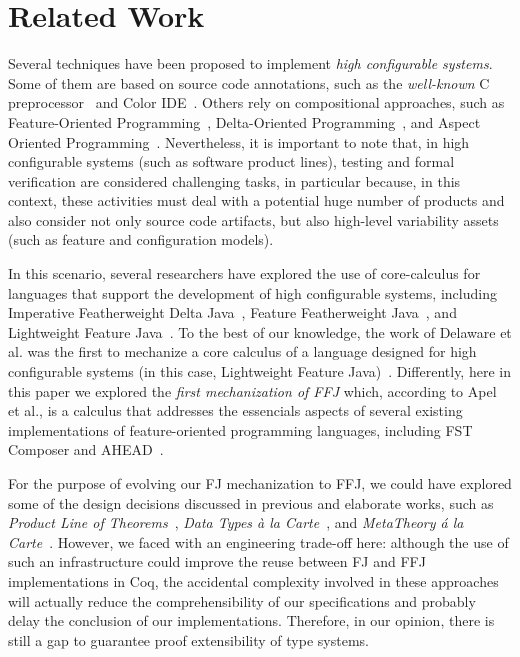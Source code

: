 \section{Related Work}\label{seq:related}

Several techniques have been proposed to implement
\emph{high configurable systems}. Some of
them are based on source code annotations, such as
the \emph{well-known} C preprocessor~\cite{stallman:cpp} and Color IDE~\cite{kastner:icse2008}. Others
rely on compositional approaches, such as
Feature-Oriented Programming~\cite{batory-tse2004,batory_feature-oriented_2004},
Delta-Oriented Programming~\cite{schaefer_delta-oriented_2010}, 
and Aspect Oriented Programming~\cite{kiczales:ecoop2001,alves:splc2005}.
Nevertheless, it is important to
note that, in high configurable systems (such as software
product lines), testing and formal verification are considered
challenging tasks, in particular because, in this context,
these activities must deal with a potential huge number of
products and also consider not only source code artifacts,
but also high-level variability assets (such as feature and
configuration models).

In this scenario, several researchers have explored
the use of core-calculus for languages that
support the development of high configurable systems,
including Imperative Featherweight Delta Java~\cite{schaefer:aosd2011}, Feature
Featherweight Java~\cite{apel_feature_2008}, and Lightweight Feature Java~\cite{delaware:fse-2009}.
To the best of our knowledge, the work of Delaware
et al. was the first to mechanize a core calculus
of a language designed for high configurable systems (in
this case, Lightweight Feature Java)~\cite{delaware:fse-2009}. Differently, here in
this paper we explored the \emph{first mechanization of \acf{FFJ}}
which, according to Apel et al., is a calculus that
addresses the essencials aspects of several
existing implementations of feature-oriented programming
languages, including FST Composer and AHEAD~\cite{apel_feature_2008}. 

For the purpose of evolving our \ac{FJ} mechanization
to \ac{FFJ}, we could have explored some of the
design decisions discussed in previous and elaborate works, such as
\emph{Product Line of Theorems}~\cite{delaware:oopsla2011},
\emph{Data Types \`{a} la Carte}~\cite{swierstra_2008},
and \emph{MetaTheory \'{a} la Carte}~\cite{delaware:popl2013}.
However, we faced with
an engineering trade-off here: although the use of such an
infrastructure could improve the reuse between \ac{FJ} and \ac{FFJ}
implementations in Coq, the accidental complexity involved in
these approaches will actually reduce the comprehensibility of our
specifications and probably delay the conclusion of our
implementations. Therefore, in our opinion, there is still a
gap to guarantee proof extensibility of type systems. 
